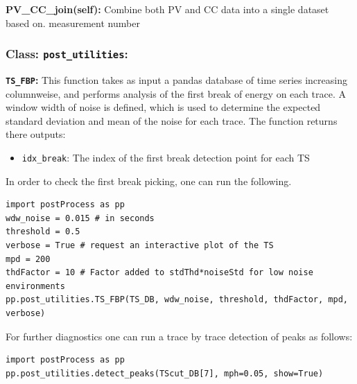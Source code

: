 \documentclass{article}
\begin{document}
	\textbf{PV\_CC\_join(self):}
	Combine both PV and CC data into a single dataset based on.\newline
        measurement number
	\subsubsection{Class: \texttt{post\_utilities}:}
	\textbf{\texttt{TS\_FBP}:}
	This function takes as input a pandas database of time series increasing columnweise, and performs analysis of the first break of energy on each trace. A window width of noise is defined, which is used to determine the expected standard deviation and mean of the noise for each trace. The function returns there outputs:
	
	\begin{itemize}
		\item \texttt{idx\_break}: The index of the first break detection point for each TS
	\end{itemize}

In order to check the first break picking, one can run the following.
\begin{lstlisting}[basicstyle=\small, frame=single]
import postProcess as pp
wdw_noise = 0.015 # in seconds
threshold = 0.5
verbose = True # request an interactive plot of the TS
mpd = 200
thdFactor = 10 # Factor added to stdThd*noiseStd for low noise environments
pp.post_utilities.TS_FBP(TS_DB, wdw_noise, threshold, thdFactor, mpd, verbose)
\end{lstlisting}

For further diagnostics one can run a trace by trace detection of peaks as follows:
\begin{lstlisting}[basicstyle=\small, frame=single]
import postProcess as pp
pp.post_utilities.detect_peaks(TScut_DB[7], mph=0.05, show=True)
\end{lstlisting}







\end{document}
